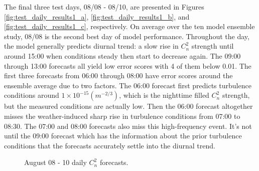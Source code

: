The final three test days, 08/08 - 08/10, are presented in Figures \ref{fig:test_daily_results1_a}, \ref{fig:test_daily_results1_b}, and \ref{fig:test_daily_results1_c}, respectively. On average over the ten model ensemble study, 08/08 is the second best day of model performance. Throughout the day, the model generally predicts diurnal trend: a slow rise in $C_{n}^{2}$ strength until around 15:00 when conditions steady then start to decrease again. The 09:00 through 13:00 forecasts all yield low error scores with 4 of them below 0.01. The first three forecasts from 06:00 through 08:00 have error scores around the ensemble average due to two factors. The 06:00 forecast first predicts turbulence conditions around $1 \times 10^{-15} (m^{-2/3})$, which is the nighttime filled $C_{n}^{2}$ strength, but the measured conditions are actually low. Then the 06:00 forecast altogether misses the weather-induced sharp rise in turbulence conditions from 07:00 to 08:30. The 07:00 and 08:00 forecasts also miss this high-frequency event. It's not until the 09:00 forecast which has the information about the prior turbulence conditions that the forecasts accurately settle into the diurnal trend.
\begin{figure}[h!]
	\centering
	\hfill
	\hfill
	\caption{August 08 - 10 daily $C_{n}^{2}$ forecasts.}
	\label{fig:test_daily_results1}
\end{figure}

